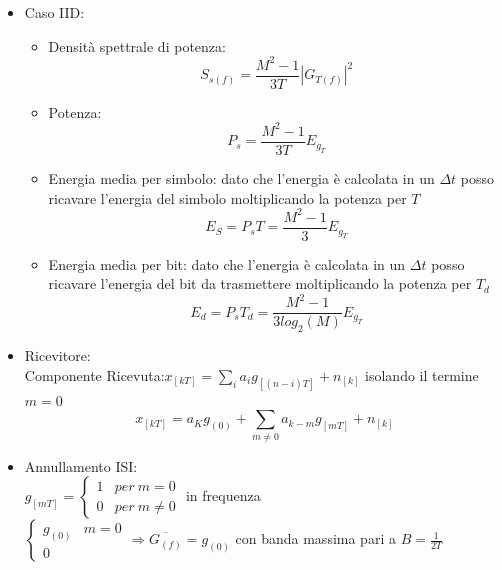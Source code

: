 \begin{itemize}
            \item {Caso IID:
                \begin{itemize}
                    \item {Densità spettrale di potenza:
                        \[
                            S_{s(f)} = \frac{M^2-1}{3T}\left|G_{T(f)}\right|^2
                        \]
                    }
                    \item {Potenza:
                        \[
                            P_s = \frac{M^2-1}{3T}E_{g_T}
                        \]
                    }
                    \item {Energia media per simbolo: dato che l'energia è calcolata in un $\Delta t$ posso ricavare l'energia del simbolo moltiplicando la potenza per $T$
                        \[
                            E_S = P_sT = \frac{M^2-1}{3}E_{g_T}
                        \]
                    }
                    \item {Energia media per bit: dato che l'energia è calcolata in un $\Delta t$ posso ricavare l'energia del bit da trasmettere
                    moltiplicando la potenza per $T_d$
                        \[
                            E_d = P_sT_d = \frac{M^2-1}{3log_2(M)}E_{g_T}
                        \]
                    }
                \end{itemize}
            }
            \item {Ricevitore:\\
                Componente Ricevuta:$x_{[kT]} = \sum_{i}a_ig_{[(n-i)T]}+n_{[k]}$
                isolando il termine $m=0$
                \[
                    x_{[kT]} = a_Kg_{(0)} + \sum_{m\neq 0}a_{k-m}g_{[mT]}+n_{[k]}    
                \]
            }
            \item {Annullamento ISI:\\ 
                $g_{[mT]} = 
                \begin{cases}
                    1   &per \ m=0\nonumber \\
                    0   &per \ m\neq 0\nonumber
                \end{cases}$
                in frequenza\\
                $
                \begin{cases}
                    g_{(0)} & m=0\nonumber \\
                    0 &\nonumber
                \end{cases}  \Rightarrow \overline{G_{(f)}} = g_{(0)} 
                $
                con banda massima pari a $B=\frac{1}{2T}$
            }
        \end{itemize}
